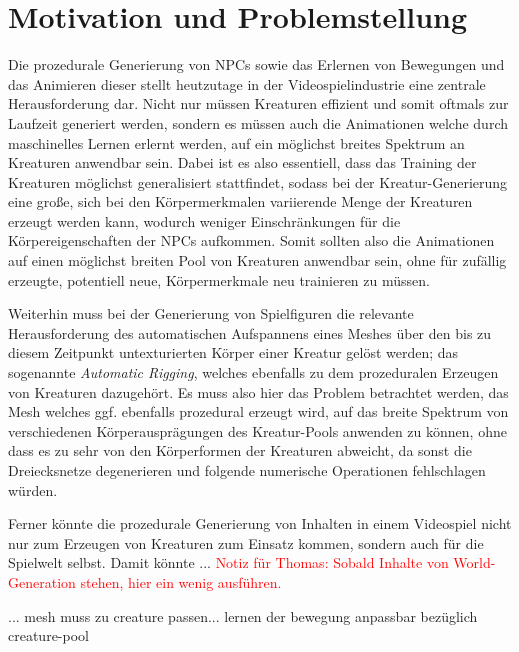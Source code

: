 \section{Motivation und Problemstellung}

Die prozedurale Generierung von NPCs sowie das Erlernen von Bewegungen und das Animieren dieser stellt heutzutage in der Videospielindustrie eine zentrale Herausforderung dar. Nicht nur müssen Kreaturen effizient und somit oftmals zur Laufzeit generiert werden, sondern es müssen auch die Animationen welche durch maschinelles Lernen erlernt werden, auf ein möglichst breites Spektrum an Kreaturen anwendbar sein. Dabei ist es also essentiell, dass das Training der Kreaturen möglichst generalisiert stattfindet, sodass bei der Kreatur-Generierung eine große, sich bei den Körpermerkmalen variierende Menge der Kreaturen erzeugt werden kann, wodurch weniger Einschränkungen für die Körpereigenschaften der NPCs aufkommen. Somit sollten also die Animationen auf einen möglichst breiten Pool von Kreaturen anwendbar sein, ohne für zufällig erzeugte, potentiell neue, Körpermerkmale neu trainieren zu müssen.

Weiterhin muss bei der Generierung von Spielfiguren die relevante Herausforderung des automatischen Aufspannens eines Meshes über den bis zu diesem Zeitpunkt untexturierten Körper einer Kreatur gelöst werden; das sogenannte \textit{Automatic Rigging}, welches ebenfalls zu dem prozeduralen Erzeugen von Kreaturen dazugehört. Es muss also hier das Problem betrachtet werden, das Mesh welches ggf. ebenfalls prozedural erzeugt wird, auf das breite Spektrum von verschiedenen Körperausprägungen des Kreatur-Pools anwenden zu können, ohne dass es zu sehr von den Körperformen der Kreaturen abweicht, da sonst die Dreiecksnetze degenerieren und folgende numerische Operationen fehlschlagen würden.

Ferner könnte die prozedurale Generierung von Inhalten in einem Videospiel nicht nur zum Erzeugen von Kreaturen zum Einsatz kommen, sondern auch für die Spielwelt selbst. Damit könnte ... \textcolor{red}{Notiz für Thomas: Sobald Inhalte von World-Generation stehen, hier ein wenig ausführen.}


  ... mesh muss zu creature passen... lernen der bewegung anpassbar bezüglich creature-pool